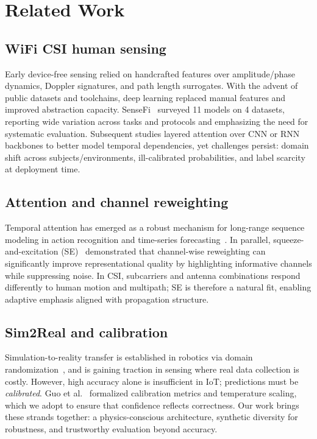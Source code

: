 \documentclass[journal]{IEEEtran}
\begin{document}
\section{Related Work}
\subsection{WiFi CSI human sensing}
Early device-free sensing relied on handcrafted features over amplitude/phase dynamics, Doppler signatures, and path length surrogates. With the advent of public datasets and toolchains, deep learning replaced manual features and improved abstraction capacity. SenseFi~\cite{yang2023sensefi} surveyed 11 models on 4 datasets, reporting wide variation across tasks and protocols and emphasizing the need for systematic evaluation. Subsequent studies layered attention over CNN or RNN backbones to better model temporal dependencies, yet challenges persist: domain shift across subjects/environments, ill-calibrated probabilities, and label scarcity at deployment time.

\subsection{Attention and channel reweighting}
Temporal attention has emerged as a robust mechanism for long-range sequence modeling in action recognition and time-series forecasting~\cite{li2020tea,bertasius2021timesformer,lim2021tft,zhou2021informer}. In parallel, squeeze-and-excitation (SE)~\cite{se_networks2018} demonstrated that channel-wise reweighting can significantly improve representational quality by highlighting informative channels while suppressing noise. In CSI, subcarriers and antenna combinations respond differently to human motion and multipath; SE is therefore a natural fit, enabling adaptive emphasis aligned with propagation structure.

\subsection{Sim2Real and calibration}
Simulation-to-reality transfer is established in robotics via domain randomization~\cite{peng2018sim2real}, and is gaining traction in sensing where real data collection is costly. However, high accuracy alone is insufficient in IoT; predictions must be \emph{calibrated}. Guo et al.~\cite{calibration_guo2017} formalized calibration metrics and temperature scaling, which we adopt to ensure that confidence reflects correctness. Our work brings these strands together: a physics-conscious architecture, synthetic diversity for robustness, and trustworthy evaluation beyond accuracy.
\end{document}
